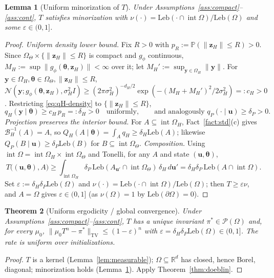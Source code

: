 \documentclass[11pt]{article}
\DeclareMathOperator{\intr}{int}
\theoremstyle{plain}
\newtheorem{theorem}{Theorem}
\newtheorem{lemma}[theorem]{Lemma}
\theoremstyle{definition}
\theoremstyle{remark}
\newcommand{\R}{\mathbb{R}}
\newcommand{\Prob}{\mathbb{P}}
\newcommand{\cP}{\mathcal{P}}
\newcommand{\Om}{\Omega}
\newcommand{\Leb}{\mathrm{Leb}}
\newcommand{\TV}{\mathrm{TV}}
\newcommand{\Normal}{\mathcal{N}}
\newcommand{\bth}{\bm{\theta}}
\newcommand{\bu}{\bm{u}}
\newcommand{\norm}[1]{\lVert #1 \rVert}
\begin{document}
\begin{lemma}[Uniform minorization of $T$]
\label{lem:minor}
Under Assumptions~\ref{ass:compact}--\ref{ass:cont}, $T$ satisfies minorization with
$\nu(\cdot)=\Leb(\cdot\cap\intr\Om)/\Leb(\Om)$ and some $\varepsilon\in(0,1]$.
\end{lemma}
\begin{proof}
\emph{Uniform density lower bound.} Fix $R>0$ with $p_R:=\Prob(\norm{\bm z_H}\le R)>0$. Since
$\Om_\Theta\times\{\norm{\bm z_H}\le R\}$ is compact and $g_\phi$ continuous,
$M_H:=\sup\norm{g_\phi(\bth,\bm z_H)}<\infty$ over it; let $M_H':=\sup_{\bm y\in\Om_H}\norm{\bm y}$.
For $\bm y\in\Om_H,\bth\in\Om_\Theta,\norm{\bm z_H}\le R$,
$\Normal(\bm y;g_\phi(\bth,\bm z_H),\sigma_H^2 I)\ge(2\pi\sigma_H^2)^{-d_H/2}\exp(-(M_H+M_H')^2/2\sigma_H^2)=:c_H>0$.
Restricting \eqref{eq:qH-density} to $\{\norm{\bm z_H}\le R\}$,
\begin{equation}\label{eq:deltaH}
  q_H(\bm y\mid\bth)\ge c_H\,p_R=:\delta_H>0\quad\text{uniformly},\qquad
  \text{and analogously } q_P(\cdot\mid\bu)\ge\delta_P>0.
\end{equation}
\emph{Projection preserves the interior bound.} For $A\subseteq\intr\Om_H$, Fact~\ref{fact:std}(c)
gives $\mathcal B_H^{-1}(A)=A$, so $Q_H(A\mid\bth)=\int_A q_H\ge\delta_H\Leb(A)$; likewise
$Q_P(B\mid\bu)\ge\delta_P\Leb(B)$ for $B\subseteq\intr\Om_\Theta$. \emph{Composition.} Using
$\intr\Om=\intr\Om_H\times\intr\Om_\Theta$ and Tonelli, for any $A$ and state $(\bu,\bth)$,
\[
  T\big((\bu,\bth),A\big)\ge\int_{\intr\Om_H}\delta_P\,\Leb(A_{\bu'}\cap\intr\Om_\Theta)\,\delta_H\,d\bu'
  =\delta_H\delta_P\,\Leb(A\cap\intr\Om).
\]
Set $\varepsilon:=\delta_H\delta_P\Leb(\Om)$ and $\nu(\cdot)=\Leb(\cdot\cap\intr\Om)/\Leb(\Om)$; then
$T\ge\varepsilon\nu$, and $A=\Om$ gives $\varepsilon\in(0,1]$ (as $\nu(\Om)=1$ by $\Leb(\partial\Om)=0$).
\end{proof}

\begin{theorem}[Uniform ergodicity / global convergence]
\label{thm:A}
Under Assumptions~\ref{ass:compact}--\ref{ass:cont}, $T$ has a unique invariant $\pi^\ast\in\cP(\Om)$
and, for every $\mu_0$, $\norm{\mu_0T^n-\pi^\ast}_\TV\le(1-\varepsilon)^n$ with
$\varepsilon=\delta_H\delta_P\Leb(\Om)\in(0,1]$. The rate is uniform over initializations.
\end{theorem}
\begin{proof}
$T$ is a kernel (Lemma~\ref{lem:measurable}); $\Om\subseteq\R^d$ has closed, hence Borel, diagonal;
minorization holds (Lemma~\ref{lem:minor}). Apply Theorem~\ref{thm:doeblin}.
\end{proof}
\end{document}
